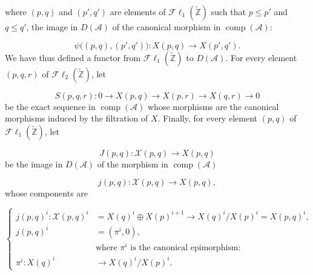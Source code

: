 \clearpage
{}%
\begingroup\small\setlength{\parskip}{0pt}\setlength{\emergencystretch}{1.5em}
\setlength{\abovedisplayskip}{4pt plus 2pt minus 2pt}%
\setlength{\belowdisplayskip}{4pt plus 2pt minus 2pt}%

\noindent where $(p,q)$ and $(p',q')$ are elements of
$\mathcal{F}\ell_1(\widetilde{\mathbb Z})$ such that $p\leq p'$ and
$q\leq q'$, the image in $D(\mathcal A)$ of the canonical morphism in
$\operatorname{comp}(\mathcal A)$:

\begin{equation}
\psi\bigl((p,q),(p',q')\bigr)\colon
X(p,q)\longrightarrow X(p',q').
\tag{4.2.2.3}
\end{equation}
We have thus defined a functor from
$\mathcal{F}\ell_1(\widetilde{\mathbb Z})$ to $D(\mathcal A)$. For every
element $(p,q,r)$ of
$\mathcal{F}\ell_2(\widetilde{\mathbb Z})$, let

\begin{equation}
S(p,q,r)\colon
0\longrightarrow X(p,q)\longrightarrow X(p,r)
\longrightarrow X(q,r)\longrightarrow0
\tag{4.2.2.4}
\end{equation}
be the exact sequence in $\operatorname{comp}(\mathcal A)$ whose
morphisms are the canonical morphisms induced by the filtration of $X$.
Finally, for every element $(p,q)$ of
$\mathcal{F}\ell_1(\widetilde{\mathbb Z})$, let

\begin{equation}
J(p,q)\colon\mathcal X(p,q)\longrightarrow X(p,q)
\tag{4.2.2.5}
\end{equation}
be the image in $D(\mathcal A)$ of the morphism in
$\operatorname{comp}(\mathcal A)$

\begin{equation}
j(p,q)\colon\mathcal X(p,q)\longrightarrow X(p,q),
\tag{4.2.2.6}
\end{equation}
whose components are

\begin{equation}
\left\{
\begin{aligned}
j(p,q)^i\colon\mathcal X(p,q)^i
 &=X(q)^i\oplus X(p)^{i+1}
   \longrightarrow X(q)^i/X(p)^i=X(p,q)^i,\\
j(p,q)^i&=(\pi^i,0),\\
&\text{where $\pi^i$ is the canonical epimorphism:}\\
\pi^i\colon X(q)^i&\longrightarrow X(q)^i/X(p)^i.
\end{aligned}
\right.
\tag{4.2.2.7}
\end{equation}

